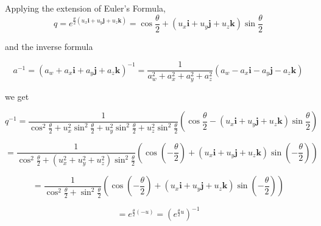 Applying the extension of Euler's Formula, 
$$q = e^{ 
	\frac{\theta}{2}
	( u_x \mathbf{i} + u_y \mathbf{j} + u_z \mathbf{k} )
	}
=
	\cos \frac{\theta}{2} + ( u_x \mathbf{i} + u_y \mathbf{j} + u_z \mathbf{k} ) \sin \frac{\theta}{2}
$$

and the inverse formula

$$a^{-1} = (a_w + a_x \mathbf{i} + a_y \mathbf{j} + a_z \mathbf{k})^{-1} = 
\frac{1}{a_w^2 + a_x^2 + a_y^2 + a_z^2} (a_w - a_x \mathbf{i} - a_y \mathbf{j} - a_z \mathbf{k} )$$

we get

$$q^{-1} = \frac{1}{
	\cos^2 \frac{\theta}{2}
	 + u_x^2 \sin ^2 \frac{\theta}{2}
	 + u_y^2 \sin ^2 \frac{\theta}{2}
	 + u_z^2 \sin ^2 \frac{\theta}{2}
	}
	\left(\cos \frac{\theta}{2} - ( u_x \mathbf{i} + u_y \mathbf{j} + u_z \mathbf{k} ) \sin \frac{\theta}{2}\right)
$$

$$ = \frac{1}{
	\cos^2 \frac{\theta}{2}
	 + (u_x^2 
	 + u_y^2 
	 + u_z^2) \sin ^2 \frac{\theta}{2}
	}
	\left(\cos \left( - \frac{\theta}{2} \right) + ( u_x \mathbf{i} + u_y \mathbf{j} + u_z \mathbf{k} ) \sin \left(-\frac{\theta}{2}\right)\right)
$$

$$ = \frac{1}{
	\cos^2 \frac{\theta}{2}
	+ \sin ^2 \frac{\theta}{2}
	}
	\left(\cos \left( - \frac{\theta}{2} \right) + ( u_x \mathbf{i} + u_y \mathbf{j} + u_z \mathbf{k} ) \sin \left(-\frac{\theta}{2}\right)\right)
$$

$$ = e^{\frac{\theta}{2}(-u)} = \left(e^{\frac{\theta}{2}u}\right)^{-1}
$$

